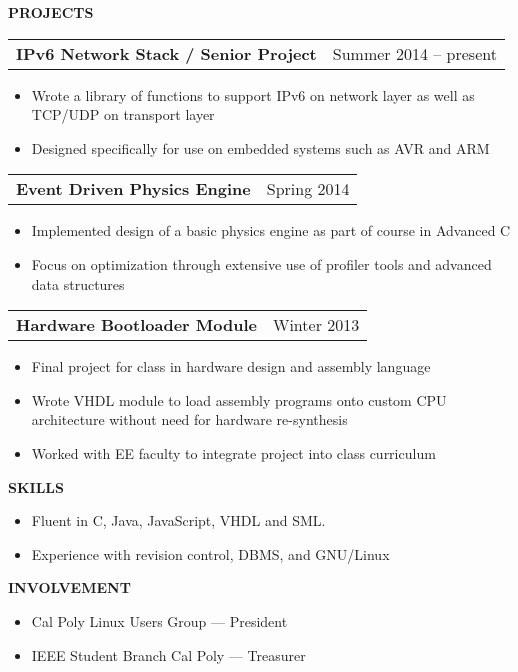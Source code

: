 \documentclass[12pt]{article}
\begin{document}
\textbf{PROJECTS}
\begin{adjustwidth*}{3em}{0em}
  \vspace*{-3mm}
  \begin{tabularx}{\linewidth}{@{}XR@{}}
    \textbf{IPv6 Network Stack / Senior Project} & Summer 2014 -- present
  \end{tabularx}
  \begin{itemize}
    \vspace*{-3mm}
  \item Wrote a library of functions to support IPv6 on network layer as well as TCP/UDP on transport layer
  \item Designed specifically for use on embedded systems such as AVR and ARM
  \end{itemize}
  \vspace*{3mm}
  \begin{tabularx}{\linewidth}{@{}XR@{}}
    \textbf{Event Driven Physics Engine} & Spring 2014
  \end{tabularx}
  \begin{itemize}
    \vspace*{-3mm}
  \item Implemented design of a basic physics engine as part of course in Advanced C
  \item Focus on optimization through extensive use of profiler tools and advanced data structures
  \end{itemize}
  \vspace*{3mm}
  \begin{tabularx}{\linewidth}{@{}XR@{}}
    \textbf{Hardware Bootloader Module} &  Winter 2013
  \end{tabularx}
  \begin{itemize}
    \vspace*{-3mm}
  \item Final project for class in hardware design and assembly language
  \item Wrote VHDL module to load assembly programs onto custom CPU architecture without need for hardware re-synthesis
  \item Worked with EE faculty to integrate project into class curriculum
  \end{itemize}
\end{adjustwidth*}
\vspace*{3mm}
\textbf{SKILLS}
\begin{adjustwidth*}{3em}{0em}
  \vspace*{-3mm}
  \begin{itemize}
  \item Fluent in C, Java, JavaScript, VHDL and SML.
  \item Experience with revision control, DBMS, and GNU/Linux
  \end{itemize}
\end{adjustwidth*}
\vspace*{3mm}
\textbf{INVOLVEMENT}
\begin{adjustwidth*}{3em}{0em}
  \vspace*{-3mm}
  \begin{itemize}
  \item Cal Poly Linux Users Group --- President
  \item IEEE Student Branch Cal Poly --- Treasurer
  \end{itemize}
\end{adjustwidth*}
\end{document}

